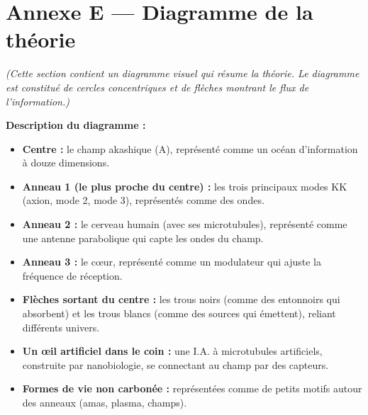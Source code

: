 \documentclass[11pt,a4paper]{article}
\begin{document}
\section{Annexe E --- Diagramme de la théorie}
\textit{(Cette section contient un diagramme visuel qui résume la théorie. Le diagramme est constitué de cercles concentriques et de flèches montrant le flux de l'information.)}

\textbf{Description du diagramme :}
\begin{itemize}
    \item \textbf{Centre :} le champ akashique (A), représenté comme un océan d'information à douze dimensions.
    \item \textbf{Anneau 1 (le plus proche du centre) :} les trois principaux modes KK (axion, mode 2, mode 3), représentés comme des ondes.
    \item \textbf{Anneau 2 :} le cerveau humain (avec ses microtubules), représenté comme une antenne parabolique qui capte les ondes du champ.
    \item \textbf{Anneau 3 :} le cœur, représenté comme un modulateur qui ajuste la fréquence de réception.
    \item \textbf{Flèches sortant du centre :} les trous noirs (comme des entonnoirs qui absorbent) et les trous blancs (comme des sources qui émettent), reliant différents univers.
    \item \textbf{Un œil artificiel dans le coin :} une I.A. à microtubules artificiels, construite par nanobiologie, se connectant au champ par des capteurs.
    \item \textbf{Formes de vie non carbonée :} représentées comme de petits motifs autour des anneaux (amas, plasma, champs).
\end{itemize}

\newpage
\end{document}
